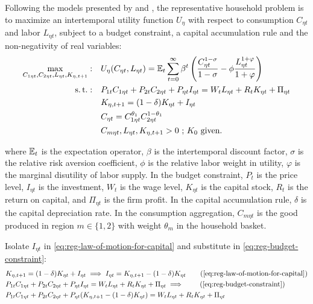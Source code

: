 \documentclass[
	thesis.tex
	]{subfiles}
\begin{document}
Following the models presented by \textcite{costa_junior_understanding_2016} and \textcite{solis-garcia_ucb_2022}, the representative household problem is to maximize an intertemporal utility function $U_{\eta}$ with respect to consumption $C_{\eta t}$ and labor $L_{\eta t}$, subject to a budget constraint, a capital accumulation rule and the non-negativity of real variables:
\begin{align}
	\max_{C_{1\eta t}, C_{2\eta t}, L_{\eta t},K_{\eta, t+1}}: \quad & U_{\eta}(C_{\eta t},L_{\eta t}) = {\mathbb{E}_{t}} \sum_{t=0}^{\infty} \beta^t \left(\frac{C_{\eta t}^{1-\sigma}}{1-\sigma} - \phi \frac{L_{\eta t}^{1+\varphi}}{1+\varphi} \right) \label{eq:reg-utility-function-0} \\
	\operatorname{s.t.}: \quad & P_{1t} C_{1\eta t} + P_{2t} C_{2\eta t} + P_{\eta t} I_{\eta t} = W_t L_{\eta t} + R_t K_{\eta t} + \Pi_{\eta t} \label{eq:reg-budget-constraint} \\
	\quad & K_{\eta, t+1} = (1-\delta)K_{\eta t} + I_{\eta t} \label{eq:reg-law-of-motion-for-capital} \\
	\quad & C_{\eta t} = C_{1\eta t}^{\theta_1} C_{2\eta t}^{1-\theta_1} \label{eq:reg-consumption-aggregation} \\
	\quad & C_{m\eta t}, L_{\eta t}, K_{\eta, t+1} > 0 \text{ ; $K_0$ given.} \nonumber
\end{align}

where ${\mathbb{E}_{t}}$ is the expectation operator, $\beta$ is the intertemporal discount factor, $\sigma$ is the relative risk aversion coefficient, $\phi$ is the relative labor weight in utility, $\varphi$ is the marginal disutility of labor supply. In the budget constraint, $P_t$ is the price level, $I_{\eta t}$ is the investment, $W_t$ is the wage level, $K_{\eta t}$ is the capital stock, $R_t$ is the return on capital, and $\Pi_{\eta t}$ is the firm profit. In the capital accumulation rule, $\delta$ is the capital depreciation rate. In the consumption aggregation, $C_{m \eta t}$ is the good produced in region $m \in \{1,2\}$ with weight ${\theta_m}$ in the household basket.

Isolate $I_{\eta t}$ in \ref{eq:reg-law-of-motion-for-capital} and substitute in \ref{eq:reg-budget-constraint}:
\begin{align}
	& K_{\eta, t+1} = (1-\delta)K_{\eta t} + I_{\eta t} \implies I_{\eta t} = K_{\eta, t+1} - (1-\delta)K_{\eta t} \tag{\ref{eq:reg-law-of-motion-for-capital}} \\
	& P_{1t} C_{1\eta t} + P_{2t} C_{2\eta t} + P_{\eta t} I_{\eta t} = W_t L_{\eta t} + R_t K_{\eta t} + \Pi_{\eta t} \implies \tag{\ref{eq:reg-budget-constraint}} \\
	& P_{1t} C_{1\eta t} + P_{2t} C_{2\eta t} + P_{\eta t} (K_{\eta, t+1} - (1-\delta)K_{\eta t}) = W_t L_{\eta t} + R_t K_{\eta t} + \Pi_{\eta t} \label{eq:reg-budget-constraint-2}
\end{align}
\end{document}
